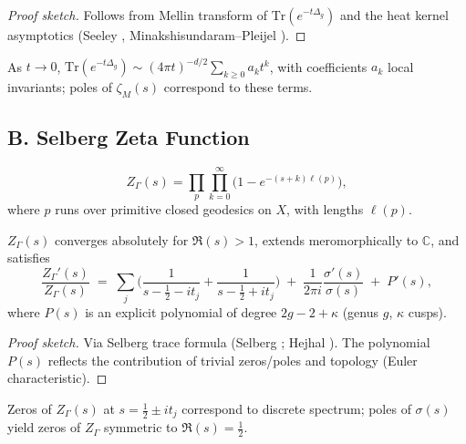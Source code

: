 \begin{proof}[Proof sketch]
Follows from Mellin transform of $\mathrm{Tr}(e^{-t\Delta_g})$ and the heat kernel asymptotics
(Seeley \cite{Seeley1967}, Minakshisundaram–Pleijel \cite{Minakshisundaram1949}).
\end{proof}

\begin{remark}
As $t\to0$, $\mathrm{Tr}(e^{-t\Delta_g})\sim (4\pi t)^{-d/2}\sum_{k\ge0}a_k t^k$,
with coefficients $a_k$ local invariants; poles of $\zeta_M(s)$ correspond to these terms.
\end{remark}


\subsection*{B. Selberg Zeta Function}
\label{subsec:selberg-zeta}

\begin{definition}
\[
  Z_\Gamma(s)=\prod_{p}\prod_{k=0}^\infty\Big(1-e^{-(s+k)\ell(p)}\Big),
\]
where $p$ runs over primitive closed geodesics on $X$, with lengths $\ell(p)$.
\end{definition}

\begin{theorem}
\label{thm:Z-cont}
$Z_\Gamma(s)$ converges absolutely for $\Re(s)>1$, extends meromorphically to $\mathbb C$, and satisfies
\[
   \frac{Z_\Gamma'(s)}{Z_\Gamma(s)} \;=\; \sum_j\Big(\frac{1}{s-\tfrac12-it_j}+\frac{1}{s-\tfrac12+it_j}\Big)
   \;+\;\frac{1}{2\pi i}\frac{\sigma'(s)}{\sigma(s)} \;+\; P'(s),
\]
where $P(s)$ is an explicit polynomial of degree $2g-2+\kappa$ (genus $g$, $\kappa$ cusps).
\end{theorem}

\begin{proof}[Proof sketch]
Via Selberg trace formula (Selberg \cite{Selberg1956}; Hejhal \cite{Hejhal1983,Hejhal1983II}).
The polynomial $P(s)$ reflects the contribution of trivial zeros/poles and topology (Euler characteristic).
\end{proof}

\begin{remark}
Zeros of $Z_\Gamma(s)$ at $s=\tfrac12\pm it_j$ correspond to discrete spectrum; poles of $\sigma(s)$ yield zeros of $Z_\Gamma$ symmetric to $\Re(s)=\tfrac12$.
\end{remark}

